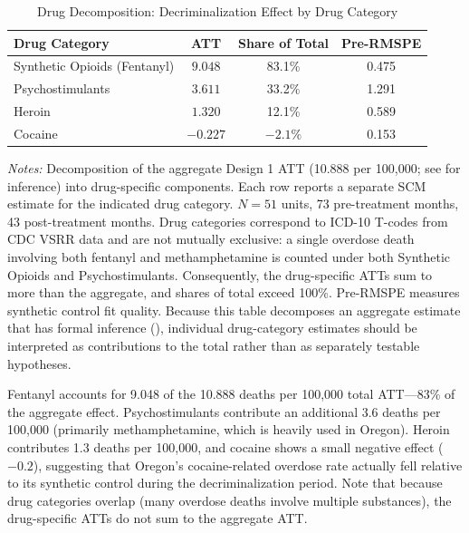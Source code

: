 \documentclass[12pt]{article}
\begin{document}
\begin{table}[H]
\centering
\caption{Drug Decomposition: Decriminalization Effect by Drug Category}
\label{tab:decomp}
\begin{threeparttable}
\begin{tabular}{lccc}
\toprule
Drug Category & ATT & Share of Total & Pre-RMSPE \\
\midrule
Synthetic Opioids (Fentanyl) & $9.048$ & 83.1\% & 0.475 \\
Psychostimulants & $3.611$ & 33.2\% & 1.291 \\
Heroin & $1.320$ & 12.1\% & 0.589 \\
Cocaine & $-0.227$ & $-2.1\%$ & 0.153 \\
\bottomrule
\end{tabular}
\begin{tablenotes}[flushleft]
\small
\item \textit{Notes:} Decomposition of the aggregate Design 1 ATT (10.888 per 100,000; see  for inference) into drug-specific components. Each row reports a separate SCM estimate for the indicated drug category. $N = 51$ units, 73 pre-treatment months, 43 post-treatment months. Drug categories correspond to ICD-10 T-codes from CDC VSRR data and are not mutually exclusive: a single overdose death involving both fentanyl and methamphetamine is counted under both Synthetic Opioids and Psychostimulants. Consequently, the drug-specific ATTs sum to more than the aggregate, and shares of total exceed 100\%. Pre-RMSPE measures synthetic control fit quality. Because this table decomposes an aggregate estimate that has formal inference (), individual drug-category estimates should be interpreted as contributions to the total rather than as separately testable hypotheses.
\end{tablenotes}
\end{threeparttable}
\end{table}

Fentanyl accounts for 9.048 of the 10.888 deaths per 100,000 total ATT---83\% of the aggregate effect. Psychostimulants contribute an additional 3.6 deaths per 100,000 (primarily methamphetamine, which is heavily used in Oregon). Heroin contributes 1.3 deaths per 100,000, and cocaine shows a small negative effect ($-0.2$), suggesting that Oregon's cocaine-related overdose rate actually fell relative to its synthetic control during the decriminalization period. Note that because drug categories overlap (many overdose deaths involve multiple substances), the drug-specific ATTs do not sum to the aggregate ATT.
\end{document}
